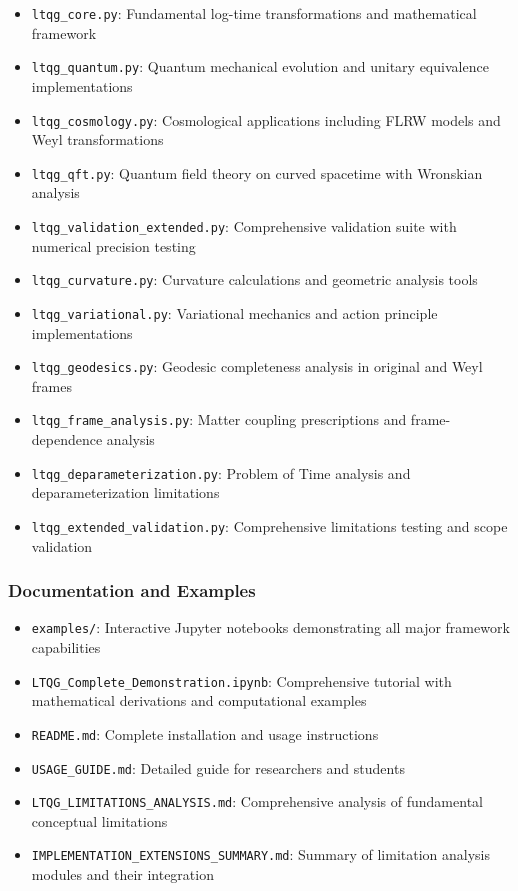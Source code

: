 \begin{itemize}
\item \texttt{ltqg\_core.py}: Fundamental log-time transformations and mathematical framework
\item \texttt{ltqg\_quantum.py}: Quantum mechanical evolution and unitary equivalence implementations  
\item \texttt{ltqg\_cosmology.py}: Cosmological applications including FLRW models and Weyl transformations
\item \texttt{ltqg\_qft.py}: Quantum field theory on curved spacetime with Wronskian analysis
\item \texttt{ltqg\_validation\_extended.py}: Comprehensive validation suite with numerical precision testing
\item \texttt{ltqg\_curvature.py}: Curvature calculations and geometric analysis tools
\item \texttt{ltqg\_variational.py}: Variational mechanics and action principle implementations
\item \texttt{ltqg\_geodesics.py}: Geodesic completeness analysis in original and Weyl frames
\item \texttt{ltqg\_frame\_analysis.py}: Matter coupling prescriptions and frame-dependence analysis  
\item \texttt{ltqg\_deparameterization.py}: Problem of Time analysis and deparameterization limitations
\item \texttt{ltqg\_extended\_validation.py}: Comprehensive limitations testing and scope validation
\end{itemize}

\subsubsection{Documentation and Examples}

\begin{itemize}
\item \texttt{examples/}: Interactive Jupyter notebooks demonstrating all major framework capabilities
\item \texttt{LTQG\_Complete\_Demonstration.ipynb}: Comprehensive tutorial with mathematical derivations and computational examples
\item \texttt{README.md}: Complete installation and usage instructions
\item \texttt{USAGE\_GUIDE.md}: Detailed guide for researchers and students
\item \texttt{LTQG\_LIMITATIONS\_ANALYSIS.md}: Comprehensive analysis of fundamental conceptual limitations
\item \texttt{IMPLEMENTATION\_EXTENSIONS\_SUMMARY.md}: Summary of limitation analysis modules and their integration
\end{itemize}

